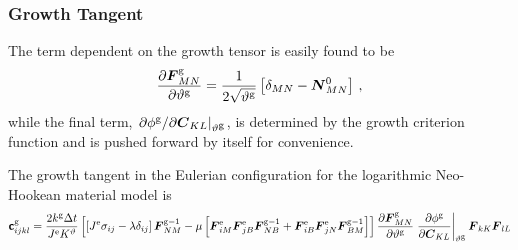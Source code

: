 \documentclass[10pt,letterpaper,oneside]{report}
\newcommand{\ten}[1]{\mbox{\boldmath $#1$}{}}
\newcommand{\tenf}[1]{\mbox{{\sffamily{\bfseries {#1}}}}}
\newcommand{\scas}[1]{\mbox{{\scriptsize{${\rm{#1}}$}}}{}}
\begin{document}
\begin{itemize}
\subsubsection{Growth Tangent}
The term dependent on the growth tensor is easily found to be
\begin{equation}
\frac{\partial \ten{F}^{\scas{g}}_{MN} }{\partial \vartheta^{\scas{g}}} = \frac{1}{2\sqrt{\vartheta^{\scas{g}}}} \left[ \delta_{MN} - \ten{N}^0_{MN} \right] \, , 
\end{equation}
while the final term, $ \left. \partial \phi^{\scas{g}} / \partial \ten{C}_{KL} \right|_{\vartheta^{\scas{g}}} $, is determined by the growth criterion function and is pushed forward by itself for convenience.  

The growth tangent in the Eulerian configuration for the logarithmic Neo-Hookean material model is
\begin{align}
\tenf{c}^{\scas{g}}_{ijkl} 
={}& \frac{2 k^{\scas{g}} \Delta t}{ J^{\scas{e}} K^\vartheta} \left[ \left[ J^{\scas{e}} \sigma_{ij} - \lambda \delta_{ij} \right] \ten{F}^{\scas{g}-1}_{NM} 
- \mu \left[ \ten{F}^{\scas{e}}_{iM} \ten{F}^{\scas{e}}_{jB} \ten{F}^{\scas{g}-1}_{NB} + \ten{F}^{\scas{e}}_{iB} \ten{F}^{\scas{e}}_{jN} \ten{F}^{\scas{g}-1}_{BM} \right] \right] \frac{\partial \ten{F}^{\scas{g}}_{MN}}{\partial \vartheta^{\scas{g}}} \left. \frac{\partial \phi^{\scas{g}} }{\partial \ten{C}_{KL}} \right|_{\vartheta^{\scas{g}}} \ten{F}_{kK} \ten{F}_{lL} 
\notag \\

\end{align}
\end{itemize}
\end{document}
